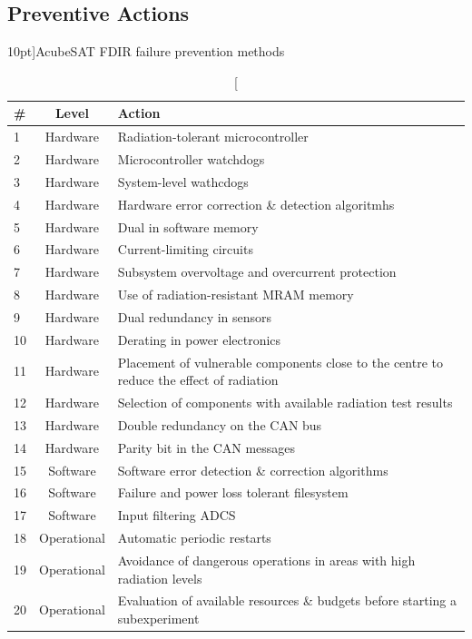 \documentclass[a4paper,nobib]{tufte-book}
\begin{document}
\clearpage
\subsection{Preventive Actions}

\begin{table}[h]
	\centering
	\caption[][10pt]{AcubeSAT \acs{FDIR} failure prevention methods}
	\label{tab:fdir_preventive}
	\renewcommand{\arraystretch}{1.5}
	\begin{tabularx}{\textwidth}{@{}lcX@{}}
		\toprule
		\# & Level & Action \\ \midrule
		1 & Hardware & Radiation-tolerant microcontroller \\
		2 & Hardware & Microcontroller watchdogs \parencite{beningo_review_watchdog_2010} \\
		3 & Hardware & System-level wathcdogs \\
		4 & Hardware & Hardware error correction \& detection algoritmhs \\
		5 & Hardware & Dual in software memory \\
		6 & Hardware & Current-limiting circuits \\
		7 & Hardware & Subsystem overvoltage and overcurrent protection \\
		8 & Hardware & Use of radiation-resistant \acs{MRAM} memory \\
		9 & Hardware & Dual redundancy in sensors \\
		10 & Hardware & Derating in power electronics \\
		11 & Hardware & Placement of vulnerable components close to the centre to reduce the effect of radiation \\
		12 & Hardware & Selection of components with available radiation test results \\
		13 & Hardware & Double redundancy on the \acs{CAN} bus \\
		14 & Hardware & Parity bit in the \acs{CAN} messages \\
		15 & Software & Software error detection \& correction algorithms \\
		16 & Software & Failure and power loss tolerant filesystem \\
		17 & Software & Input filtering \acs{ADCS} \\
		18 & Operational & Automatic periodic restarts \\
		19 & Operational & Avoidance of dangerous operations in areas with high radiation levels \\
		20 & Operational & Evaluation of available resources \& budgets before starting a subexperiment \\ \bottomrule
	\end{tabularx}
\end{table}
\end{document}
